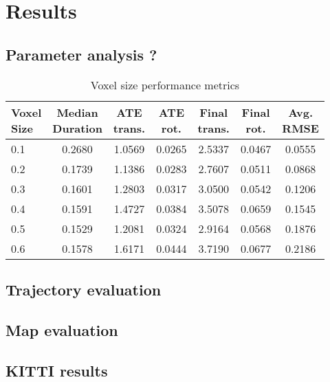\chapter{Results}
\label{ch:results}

\section{Parameter analysis ?}

\begin{table}[h]
    \centering
    \begin{tabular}{lcccccc}
        \hline
        \makecell{\textbf{Voxel}                                  \\ \textbf{Size}} &
        \makecell{\textbf{Median}                                 \\ \textbf{Duration}} &
        \makecell{\textbf{ATE}                                    \\ \textbf{trans.}} &
        \makecell{\textbf{ATE}                                    \\ \textbf{rot.}} &
        \makecell{\textbf{Final}                                  \\ \textbf{trans.}} &
        \makecell{\textbf{Final}                                  \\ \textbf{rot.}} &
        \makecell{\textbf{Avg.}                                   \\ \textbf{RMSE}} \\
        \hline
        \hline
        0.1 & 0.2680 & 1.0569 & 0.0265 & 2.5337 & 0.0467 & 0.0555 \\
        0.2 & 0.1739 & 1.1386 & 0.0283 & 2.7607 & 0.0511 & 0.0868 \\
        0.3 & 0.1601 & 1.2803 & 0.0317 & 3.0500 & 0.0542 & 0.1206 \\
        0.4 & 0.1591 & 1.4727 & 0.0384 & 3.5078 & 0.0659 & 0.1545 \\
        0.5 & 0.1529 & 1.2081 & 0.0324 & 2.9164 & 0.0568 & 0.1876 \\
        0.6 & 0.1578 & 1.6171 & 0.0444 & 3.7190 & 0.0677 & 0.2186 \\
        \hline
    \end{tabular}
    \caption{Voxel size performance metrics}
    \label{tab:voxel_metrics}
\end{table}


\section{Trajectory evaluation}

\section{Map evaluation}

\section{KITTI results}

